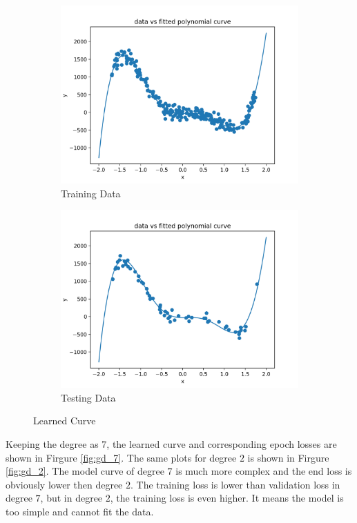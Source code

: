 \documentclass[11pt]{article}
\begin{document}
\begin{enumerate}
\begin{figure}[!h]
  \centering
  \begin{subfigure}[b]{0.4\linewidth}
    \includegraphics[width=\linewidth]{figures/best_ne_train.png}
    \caption{Training Data}
  \end{subfigure}
  \begin{subfigure}[b]{0.4\linewidth}
    \includegraphics[width=\linewidth]{figures/best_ne_test.png}
    \caption{Testing Data}
  \end{subfigure}
  \caption{Learned Curve}
  \label{fig:best_ne}
\end{figure}

Keeping the degree as $7$, the learned curve and corresponding epoch losses are shown in Firgure \ref{fig:gd_7}. The same plots for degree $2$ is shown in Firgure \ref{fig:gd_2}. The model curve of degree $7$ is much more complex and the end loss is obviously lower then degree $2$. The training loss is lower than validation loss in degree $7$, but in degree $2$, the training loss is even higher. It means the model is too simple and cannot fit the data.


\end{enumerate}
\end{document}
